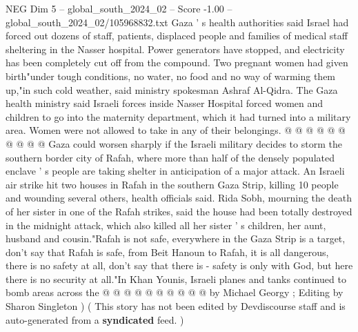 \begin{textsample}{NEG Dim 5 – global\_south\_2024\_02 – Score -1.00 – global\_south\_2024\_02/105968832.txt}
Gaza ' s health authorities said Israel had forced out dozens of staff, patients, displaced people and families of medical staff sheltering in the Nasser hospital.
Power generators have stopped, and electricity has been completely cut off from the compound.
Two pregnant women had given birth"under tough conditions, no water, no food and no way of warming them up,"in such cold weather, said ministry spokesman Ashraf Al-Qidra.
The Gaza health ministry said Israeli forces inside Nasser Hospital forced women and children to go into the maternity department, which it had turned into a military area.
Women were not allowed to take in any of their belongings. @ @ @ @ @ @ @ @ @ @ Gaza could worsen sharply if the Israeli military decides to storm the southern border city of Rafah, where more than half of the densely populated enclave ' s people are taking shelter in anticipation of a major attack.
An Israeli air strike hit two houses in Rafah in the southern Gaza Strip, killing 10 people and wounding several others, health officials said.
Rida Sobh, mourning the death of her sister in one of the Rafah strikes, said the house had been totally destroyed in the midnight attack, which also killed all her sister ' s children, her aunt, husband and cousin."Rafah is not safe, everywhere in the Gaza Strip is a target, don't say that Rafah is safe, from Beit Hanoun to Rafah, it is all dangerous, there is no safety at all, don't say that there is - safety is only with God, but here there is no security at all."In Khan Younis, Israeli planes and tanks continued to bomb areas across the @ @ @ @ @ @ @ @ @ @ by Michael Georgy ; Editing by Sharon Singleton ) ( This story has not been edited by Devdiscourse staff and is auto-generated from a \textbf{syndicated} feed. )

\end{textsample}
